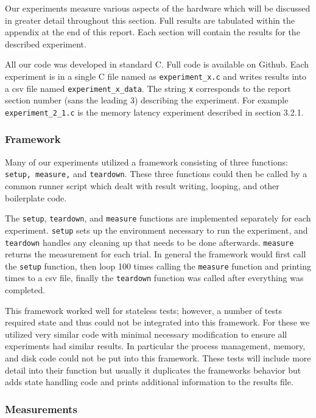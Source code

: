 Our experiments measure various aspects of the hardware which will be discussed in greater detail throughout this section.
Full results are tabulated within the appendix at the end of this report.
Each section will contain the results for the described experiment.

All our code was developed in standard C.
Full code is available on Github\cite{github}. 
Each experiment is in a single C file named as {\tt experiment_x.c} and writes results into a csv file named {\tt experiment_x_data}.
The string {\tt x} corresponds to the report section number (sans the leading 3) describing the experiment.
For example {\tt experiment_2_1.c} is the memory latency experiment described in section 3.2.1.


\subsubsection{Framework}
Many of our experiments utilized a framework consisting of three functions: {\tt setup, measure,} and {\tt teardown}.
These three functions could then be called by a common runner script which dealt with result writing, looping, and other boilerplate code.

The {\tt setup}, {\tt teardown}, and {\tt measure} functions are implemented separately for each experiment. {\tt setup} sets up the environment necessary to run the experiment, and {\tt teardown} handles any cleaning up that needs to be done afterwards. {\tt measure} returns the measurement for each trial. 
In general the framework would first call the {\tt setup} function, then loop 100 times calling the {\tt measure} function and printing times to a csv file, finally the {\tt teardown} function was called after everything was completed.

This framework worked well for stateless tests; however, a number of tests required state and thus could not be integrated into this framework.
For these we utilized very similar code with minimal necessary modification to ensure all experiments had similar results.
In particular the process management, memory, and disk code could not be put into this framework.
These tests will include more detail into their function but usually it duplicates the frameworks behavior but adds state handling code and prints additional information to the results file.

\subsubsection{Measurements}

